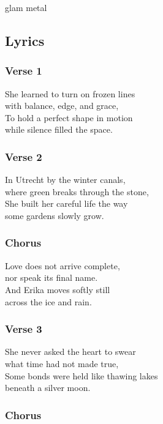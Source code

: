\documentclass[]{article}
\begin{document}
glam metal

\subsection{Lyrics}\label{lyrics-5}

\subsubsection{Verse 1}\label{verse-1}

She learned to turn on frozen lines\\
with balance, edge, and grace,\\
To hold a perfect shape in motion\\
while silence filled the space.

\subsubsection{Verse 2}\label{verse-2}

In Utrecht by the winter canals,\\
where green breaks through the stone,\\
She built her careful life the way\\
some gardens slowly grow.

\subsubsection{Chorus}\label{chorus}

Love does not arrive complete,\\
nor speak its final name.\\
And Erika moves softly still\\
across the ice and rain.

\subsubsection{Verse 3}\label{verse-3}

She never asked the heart to swear\\
what time had not made true,\\
Some bonds were held like thawing lakes\\
beneath a silver moon.

\subsubsection{Chorus}\label{chorus-1}
\end{document}
